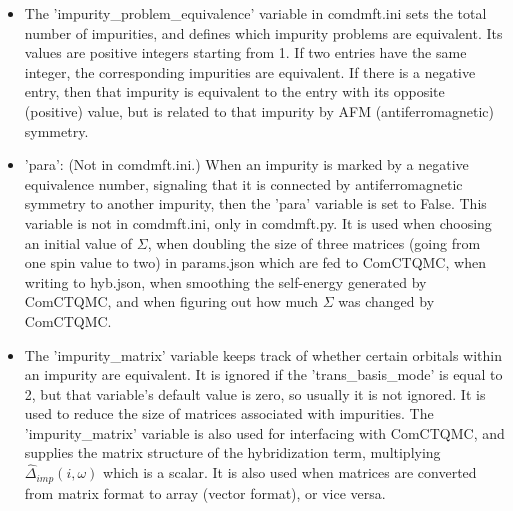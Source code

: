 \documentclass[aps,prb,singlecolumn,preprintnumbers,amsmath,amssymb]{revtex4}
\begin{document}
\begin{itemize}
\item The 'impurity\_problem\_equivalence' variable  in comdmft.ini sets the total number of impurities, and defines which impurity problems are equivalent. Its values are positive integers starting from 1.  If two entries have the same integer, the corresponding impurities are equivalent.  If there is a negative entry, then that impurity is equivalent to the entry with its opposite (positive) value, but is related to that impurity by AFM (antiferromagnetic) symmetry.
\item 'para': (Not in comdmft.ini.) When an impurity is marked by a negative equivalence number, signaling that it is connected by antiferromagnetic symmetry to another impurity, then the 'para' variable is set to False. This variable is not in comdmft.ini, only in comdmft.py. It is used when choosing an initial value of $\Sigma$, when doubling the size of three matrices (going from one spin value to two) in params.json which are fed to ComCTQMC, when writing to hyb.json,  when smoothing the self-energy generated by ComCTQMC, and when figuring out how much $\Sigma$ was changed by ComCTQMC.
\item The 'impurity\_matrix' variable keeps track of whether certain orbitals within an impurity are equivalent.  It is ignored if the 'trans\_basis\_mode' is equal to 2, but that variable's default value is zero, so usually it is not ignored. It is used to reduce the size of matrices associated with impurities.  The 'impurity\_matrix' variable is also used for interfacing with ComCTQMC, and supplies the matrix structure of the hybridization term, multiplying $\hat{\Delta}_{imp}(i,\omega)$ which is a scalar. 
It is also used when matrices are converted from matrix format to array (vector format), or vice versa. %



\end{itemize}
\end{document}
